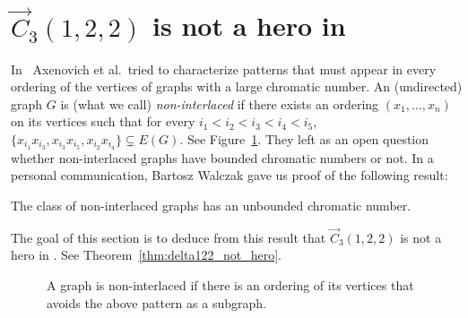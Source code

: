 

\section{$\vec C_{3}(1, 2, 2)$ is not a hero in \omgs}\label{sec:122}

In~\cite{ARU18} Axenovich et al.\ tried to characterize patterns that must appear in every ordering of the vertices of graphs with a large chromatic number. 
An (undirected) graph $G$ is (what we call) \emph{non-interlaced} if there exists an ordering $(x_1, \dots, x_n)$ on its vertices such that for every $i_1<i_2<i_3<i_4<i_5$, $\{x_{i_1}x_{i_3}, x_{i_3}x_{i_5}, x_{i_2}x_{i_4}\} \subsetneq E(G)$. See Figure~\ref{fig:non-interlaced}. They left as an open question whether non-interlaced graphs have bounded chromatic numbers or not.  In a personal communication, Bartosz Walczak gave us proof of the following result:

\begin{theorem}\label{thm:interlaced}
    The class of non-interlaced graphs has an unbounded chromatic number.
\end{theorem}

The goal of this section is to deduce from this result that $\vec C_{3}(1, 2, 2)$ is not a hero in \omgs. See Theorem~\ref{thm:delta122_not_hero}. 

 \begin{figure}[ht]
        \begin{center}
        \end{center}
        \caption{\label{fig:non-interlaced} A graph is non-interlaced if there is an ordering of its vertices that avoids the above pattern as a subgraph.}
    \end{figure}


